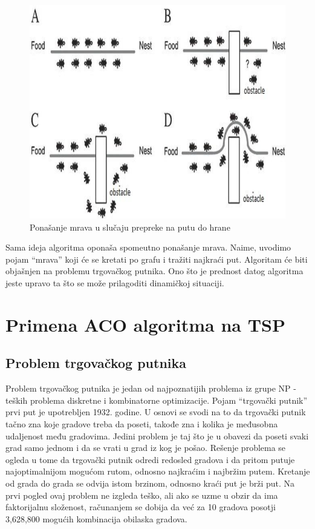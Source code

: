 \documentclass[a4paper]{article}
\begin{document}
\begin{figure}[h!]
\begin{center}
\includegraphics[scale=0.3]{aco_obstacle.png}
\end{center}
\caption{Ponašanje mrava u slučaju prepreke na putu do hrane}
\label{fig:mravi}
\end{figure}

Sama ideja algoritma oponaša spomeutno ponašanje mrava. Naime, uvodimo pojam ``mrava'' koji će se kretati po grafu i tražiti najkraći put. Algoritam će biti objašnjen na problemu trgovačkog putnika. Ono što je prednost datog algoritma jeste upravo ta što se može prilagoditi dinamičkoj situaciji.

\section{Primena ACO algoritma na TSP}
\label{acotsp}

\subsection{Problem trgovačkog putnika}
\label{subsec:podnaslov1}

Problem trgovačkog putnika je jedan od najpoznatijih problema iz grupe NP - teških problema diskretne i kombinatorne optimizacije. Pojam ``trgovački putnik'' prvi put je upotrebljen 1932. godine. U osnovi se svodi na to da trgovački putnik tačno zna koje gradove treba da poseti, takođe zna i kolika je međusobna udaljenost među gradovima. Jedini problem je taj što je u obavezi da poseti svaki grad samo jednom i da se vrati u grad iz kog je pošao. Rešenje problema se ogleda u tome da trgovački putnik odredi redosled gradova i da pritom putuje najoptimalnijom mogućom rutom, odnosno najkraćim i najbržim putem. Kretanje od grada do grada se odvija istom brzinom, odnosno kraći put je brži put. Na prvi pogled ovaj problem ne izgleda teško, ali ako se uzme u obzir da ima faktorijalnu složenost, računanjem se dobija da već za 10 gradova posotji 3,628,800 mogućih kombinacija obilaska gradova.
\end{document}
